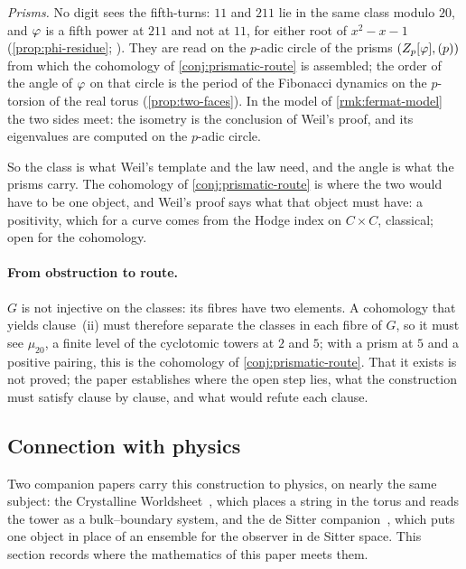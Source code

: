 \emph{Prisms.}  No digit sees the fifth-turns: $11$ and $211$ lie in the same class modulo $20$, and
$\varphi$ is a fifth power at $211$ and not at $11$, for either root of $x^2-x-1$ (\cref{prop:phi-residue};
).  They are read on the $p$-adic circle
of the prisms $(Z_p[\varphi],(p))$ from which the cohomology of \cref{conj:prismatic-route} is assembled;
the order of the angle of $\varphi$ on that circle is the period of the Fibonacci dynamics on the $p$-torsion of the
real torus
(\cref{prop:two-faces}).
In the model of \cref{rmk:fermat-model} the two sides meet: the isometry is the conclusion of Weil's
proof, and its eigenvalues are computed on the $p$-adic circle.

So the class is what Weil's template and the law need, and the angle is what the prisms carry.  The
cohomology of \cref{conj:prismatic-route} is where the two would have to be one object, and Weil's proof
says what that object must have: a positivity, which for a curve comes from the Hodge index on
$C\times C$, classical; open for the cohomology.

\paragraph{From obstruction to route.}  $G$ is not injective on the classes: its fibres have two elements.
A cohomology that yields clause~(ii) must therefore separate the classes in each fibre of $G$, so it must
see $\mu_{20}$, a finite level of the cyclotomic towers at $2$ and $5$; with a prism at $5$ and a positive
pairing, this is the cohomology of \cref{conj:prismatic-route}.  That it exists is not proved; the paper
establishes where the open step lies, what the construction must satisfy clause by clause, and what would
refute each clause.

\subsection{Connection with physics}\label{sec:disc-cw}

Two companion papers carry this construction to physics, on nearly the same subject: the Crystalline
Worldsheet~\cite{gonzalez26cw}, which places a string in the torus and reads the tower as a bulk--boundary
system, and the de Sitter companion~\cite{gonzalez26ds}, which puts one object in place of an ensemble for
the observer in de Sitter space.  This section records where the mathematics of this paper meets them.

